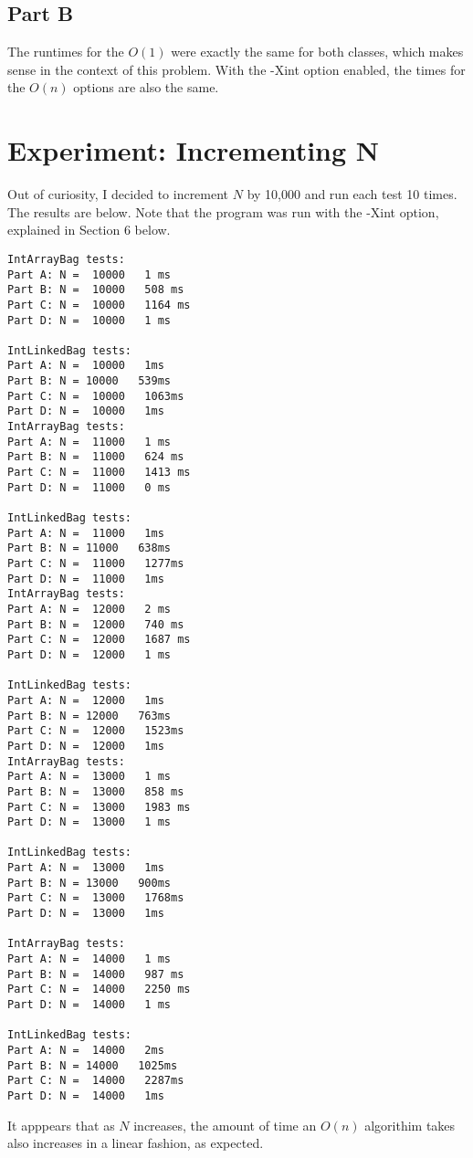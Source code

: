 \documentclass[12pt]{article} %
\begin{document}
\subsection{Part B}
The runtimes for the $O(1)$ were exactly the same for both classes, which makes sense in the context of this problem. With the -Xint option enabled, the times for the $O(n)$ options are also the same. 

\section{Experiment: Incrementing N}
Out of curiosity, I decided to increment $N$ by 10,000 and run each test 10 times. The results are below. Note that the program was run with the -Xint option, explained in Section 6 below.
\begin{lstlisting}
IntArrayBag tests:
Part A: N =  10000   1 ms 
Part B: N =  10000   508 ms
Part C: N =  10000   1164 ms 
Part D: N =  10000   1 ms

IntLinkedBag tests:
Part A: N =  10000   1ms
Part B: N = 10000   539ms
Part C: N =  10000   1063ms
Part D: N =  10000   1ms
IntArrayBag tests:
Part A: N =  11000   1 ms
Part B: N =  11000   624 ms
Part C: N =  11000   1413 ms
Part D: N =  11000   0 ms

IntLinkedBag tests:
Part A: N =  11000   1ms
Part B: N = 11000   638ms
Part C: N =  11000   1277ms
Part D: N =  11000   1ms
IntArrayBag tests:
Part A: N =  12000   2 ms
Part B: N =  12000   740 ms
Part C: N =  12000   1687 ms
Part D: N =  12000   1 ms

IntLinkedBag tests:
Part A: N =  12000   1ms
Part B: N = 12000   763ms
Part C: N =  12000   1523ms
Part D: N =  12000   1ms
IntArrayBag tests:
Part A: N =  13000   1 ms
Part B: N =  13000   858 ms
Part C: N =  13000   1983 ms
Part D: N =  13000   1 ms

IntLinkedBag tests:
Part A: N =  13000   1ms
Part B: N = 13000   900ms
Part C: N =  13000   1768ms
Part D: N =  13000   1ms

IntArrayBag tests:
Part A: N =  14000   1 ms
Part B: N =  14000   987 ms
Part C: N =  14000   2250 ms
Part D: N =  14000   1 ms

IntLinkedBag tests:
Part A: N =  14000   2ms
Part B: N = 14000   1025ms
Part C: N =  14000   2287ms
Part D: N =  14000   1ms
\end{lstlisting}
It apppears that as $N$ increases, the amount of time an $O(n)$ algorithim takes also increases in a linear fashion, as expected.
\end{document}
